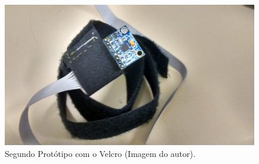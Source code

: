 	 	\begin{figure}[h!]
	 		\centering
	 		\includegraphics[keepaspectratio=true,scale=0.12]{figuras/prototipo_2_1.jpg}
	 		\caption{Segundo Protótipo com o Velcro (Imagem do autor).} 
	 		\label{prototipo2}	
	 	\end{figure}
